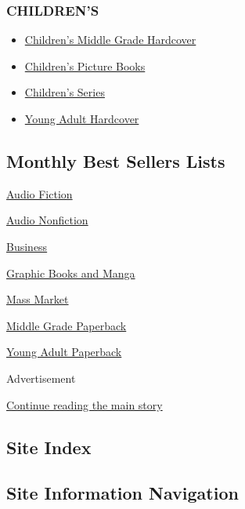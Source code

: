 \hypertarget{childrens}{%
\subsubsection{CHILDREN'S}\label{childrens}}

\begin{itemize}
\tightlist
\item
  \href{/books/best-sellers/childrens-middle-grade-hardcover/}{Children's
  Middle Grade Hardcover}
\item
  \href{/books/best-sellers/picture-books/}{Children's Picture Books}
\item
  \href{/books/best-sellers/series-books/}{Children's Series}
\item
  \href{/books/best-sellers/young-adult-hardcover/}{Young Adult
  Hardcover}
\end{itemize}

\hypertarget{monthly-best-sellers-lists}{%
\subsection{Monthly Best Sellers
Lists}\label{monthly-best-sellers-lists}}

\href{/books/best-sellers/audio-fiction/}{Audio Fiction}

\href{/books/best-sellers/audio-nonfiction/}{Audio Nonfiction}

\href{/books/best-sellers/business-books/}{Business}

\href{/books/best-sellers/graphic-books-and-manga/}{Graphic Books and
Manga}

\href{/books/best-sellers/mass-market-monthly/}{Mass Market}

\href{/books/best-sellers/middle-grade-paperback-monthly/}{Middle Grade
Paperback}

\href{/books/best-sellers/young-adult-paperback-monthly/}{Young Adult
Paperback}

Advertisement

\protect\hyperlink{after-bottom}{Continue reading the main story}

\hypertarget{site-index}{%
\subsection{Site Index}\label{site-index}}

\hypertarget{site-information-navigation}{%
\subsection{Site Information
Navigation}\label{site-information-navigation}}

